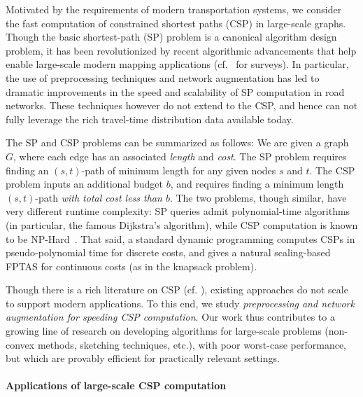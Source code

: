 Motivated by the requirements of modern transportation systems, we consider the fast computation of constrained shortest paths (CSP) in large-scale graphs. Though the basic shortest-path (SP) problem is a canonical algorithm design problem, it has been revolutionized by recent algorithmic advancements that help enable large-scale modern mapping applications (cf.~\cite{goldberg_survey,dimacs09} for surveys).
In particular, the use of preprocessing techniques and network augmentation has led to dramatic improvements in the speed and scalability of SP computation in road networks.
These techniques however do not extend to the CSP, and hence can not fully leverage the rich travel-time distribution data available today.

The SP and CSP problems can be summarized as follows: We are given a graph $G$, where each edge has an associated \emph{length} and \emph{cost}. 
The SP problem requires finding an $(s,t)$-path of minimum length for any given nodes $s$ and $t$. 
The CSP problem inputs an additional budget $b$, and requires finding a minimum length $(s,t)$-path \emph{with total cost less than $b$}.
The two problems, though similar, have very different runtime complexity: SP queries admit polynomial-time algorithms (in particular, the famous Dijkstra's algorithm), while CSP computation is known to be NP-Hard~\cite{csp_survey}.
That said, a standard dynamic programming computes CSPs in pseudo-polynomial time for discrete costs, and gives a natural scaling-based FPTAS for continuous costs (as in the knapsack problem).

Though there is a rich literature on CSP (cf. \cite{csp_survey}), existing approaches do not scale to support modern applications. 
To this end, we study \emph{preprocessing and network augmentation for speeding CSP computation}.
Our work thus contributes to a growing line of research on developing algorithms for large-scale problems (non-convex methods, sketching techniques, etc.), with poor worst-case performance, but which are provably efficient for practically relevant settings.


\paragraph*{Applications of large-scale CSP computation}

